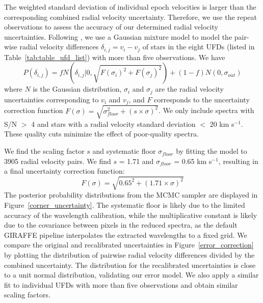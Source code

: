 \documentclass[twocolumn]{aastex63}
\begin{document}
The weighted standard deviation of individual epoch velocities is larger than the corresponding combined radial velocity uncertainty.  Therefore, we use the repeat observations to assess the accuracy of our determined radial velocity uncertainties.
Following \citet{li2019}, we use a Gaussian mixture model to model the pair-wise radial velocity differences $\delta_{i,j} = v_i - v_j$ of stars in the eight UFDs (listed in Table~\ref{tab:table_ufd_list}) with more than five observations. We have
\begin{equation}
P(\delta_{i,j}) = fN(\delta_{i,j}|0,\sqrt{F(\sigma_i)^2+F(\sigma_j)^2}) + (1-f)N(0,\sigma_{out})
\end{equation}
where $N$ is the Gaussian distribution, $\sigma_i$ and $\sigma_j$ are the radial velocity uncertainties corresponding to $v_i$ and $v_j$, and $F$ corresponds to the uncertainty correction function $F(\sigma) = \sqrt{\sigma_{floor}^2 + (s\times\sigma)^2}$. We only include spectra with S/N $>$ 4 and stars with a radial velocity standard deviation $<$ 20 km s$^{-1}$. These quality cuts minimize the effect of poor-quality spectra. 

We find the scaling factor $s$ and systematic floor $\sigma_{floor}$ by fitting the model to 3905 radial velocity pairs. We find $s$ = 1.71 and $\sigma_{floor}$ = 0.65 km s$^{-1}$, resulting in a final uncertainty correction function:
\begin{equation}
F(\sigma) = \sqrt{0.65^2 + (1.71\times\sigma)^2}
\end{equation}
The posterior probability distributions from the MCMC sampler are displayed in Figure~\ref{corner_uncertainty}. The systematic floor is likely due to the limited accuracy of the wavelength calibration, while the multiplicative constant is likely due to the covariance between pixels in the reduced spectra, as the default GIRAFFE pipeline interpolates the extracted wavelengths to a fixed grid. We compare the original and recalibrated uncertainties in Figure~\ref{error_correction} by plotting the distribution of pairwise radial velocity differences divided by the combined uncertainty. The distribution for the recalibrated uncertainties is close to a unit normal distribution, validating our error model. We also apply a similar fit to individual UFDs with more than five observations and obtain similar scaling factors.
\end{document}
